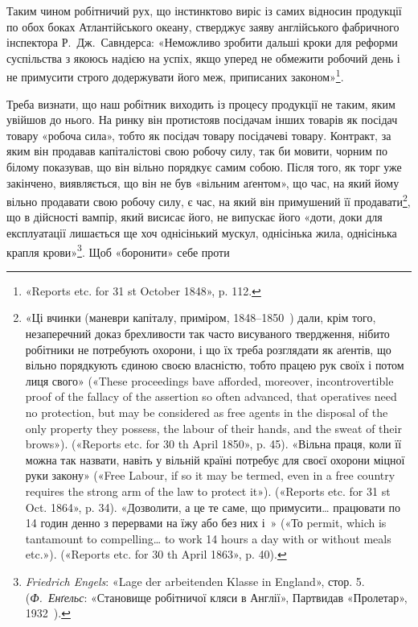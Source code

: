Таким чином робітничий рух, що інстинктово виріс із самих
відносин продукції по обох боках Атлантійського океану, стверджує
заяву англійського фабричного інспектора Р.~Дж.~Савндерса:
«Неможливо зробити дальші кроки для реформи суспільства
з якоюсь надією на успіх, якщо уперед не обмежити робочий
день і не примусити строго додержувати його меж, приписаних
законом»\footnote{
«Reports etc. for 31 st October 1848», p. 112.
}.

Треба визнати, що наш робітник виходить із процесу продукції
не таким, яким увійшов до нього. На ринку він протистояв
посідачам інших товарів як посідач товару «робоча сила», тобто
як посідач товару посідачеві товару. Контракт, за яким він продавав
капіталістові свою робочу силу, так би мовити, чорним по
білому показував, що він вільно порядкує самим собою. Після того,
як торг уже закінчено, виявляється, що він не був «вільним
аґентом», що час, на який йому вільно продавати свою робочу
силу, є час, на який він примушений її продавати\footnote{
«Ці вчинки (маневри капіталу, приміром, 1848--1850~) дали,
крім того, незаперечний доказ брехливости так часто висуваного твердження,
нібито робітники не потребують охорони, і що їх треба розглядати
як аґентів, що вільно порядкують єдиною своєю власністю, тобто
працею рук своїх і потом лиця свого» («These proceedings bave afforded,
moreover, incontrovertible proof of the fallacy of the assertion so often
advanced, that operatives need no protection, but may be considered as
free agents in the disposal of the only property they possess, the labour of
their hands, and the sweat of their brows»). («Reports etc. for 30 th April
1850», p. 45). «Вільна праця, коли її можна так назвати, навіть у вільній
країні потребує для своєї охорони міцної руки закону» («Free Labour,
if so it may be termed, even in a free country requires the strong arm of
the law to protect it»). («Reports etc. for 31 st Oct. 1864», p. 34). «Дозволити,
а це те саме, що примусити\dots{} працювати по 14 годин денно з перервами
на їжу або без них і~» («То permit, which is tantamount to
compelling\dots{} to work 14 hours a day with or without meals etc.»). («Reports
etc. for 30 th April 1863», p. 40).
}, що в дійсності
вампір, який висисає його, не випускає його «доти, доки для
експлуатації лишається ще хоч однісінький мускул, однісінька
жила, однісінька крапля крови»\footnote{
\emph{Friedrich Engels}: «Lage der arbeitenden Klasse in England»,
стор. 5. (\emph{Ф.~Енґельс}: «Становище робітничої кляси в Англії», Партвидав
«Пролетар», 1932~).
}. Щоб «боронити» себе проти
